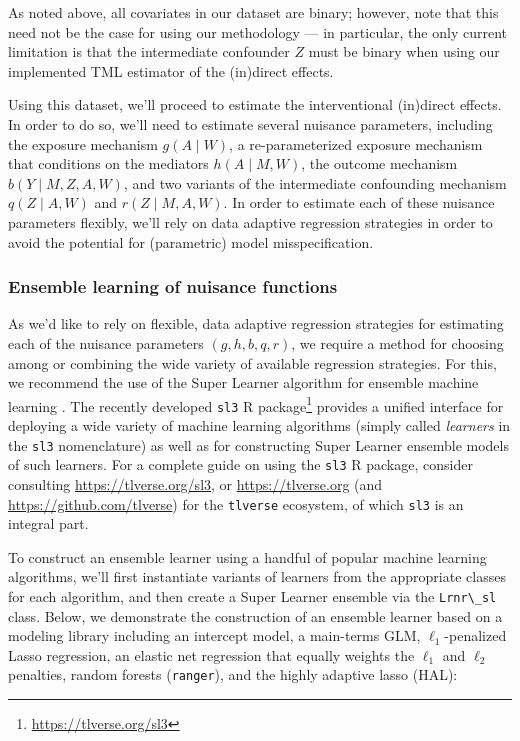 \documentclass[
  12pt,
]{book}
\newcommand{\passthrough}[1]{#1}
\renewcommand{\href}[2]{#2\footnote{\url{#1}}}
\theoremstyle{definition}
\theoremstyle{definition}
\theoremstyle{definition}
\newcommand{\1}{\mathbbm{1}}
\begin{document}
As noted above, all covariates in our dataset are binary; however, note that
this need not be the case for using our methodology --- in particular, the only
current limitation is that the intermediate confounder \(Z\) must be binary when
using our implemented TML estimator of the (in)direct effects.

Using this dataset, we'll proceed to estimate the interventional (in)direct
effects. In order to do so, we'll need to estimate several nuisance parameters,
including the exposure mechanism \(g(A \mid W)\), a re-parameterized exposure
mechanism that conditions on the mediators \(h(A \mid M, W)\), the outcome
mechanism \(b(Y \mid M, Z, A, W)\), and two variants of the intermediate
confounding mechanism \(q(Z \mid A, W)\) and \(r(Z \mid M, A, W)\). In order to
estimate each of these nuisance parameters flexibly, we'll rely on data adaptive
regression strategies in order to avoid the potential for (parametric) model
misspecification.

\hypertarget{ensemble-learning-of-nuisance-functions}{%
\subsubsection{Ensemble learning of nuisance functions}\label{ensemble-learning-of-nuisance-functions}}

As we'd like to rely on flexible, data adaptive regression strategies for
estimating each of the nuisance parameters \((g, h, b, q, r)\), we require a
method for choosing among or combining the wide variety of available regression
strategies. For this, we recommend the use of the Super Learner algorithm for
ensemble machine learning \citep{vdl2007super}. The recently developed \href{https://tlverse.org/sl3}{\passthrough{\lstinline!sl3!} R
package} \citep{coyle2020sl3} provides a unified interface
for deploying a wide variety of machine learning algorithms (simply called
\emph{learners} in the \passthrough{\lstinline!sl3!} nomenclature) as well as for constructing Super Learner
ensemble models of such learners. For a complete guide on using the \passthrough{\lstinline!sl3!} R
package, consider consulting \url{https://tlverse.org/sl3}, or \url{https://tlverse.org}
(and \url{https://github.com/tlverse}) for the \passthrough{\lstinline!tlverse!} ecosystem, of which \passthrough{\lstinline!sl3!} is
an integral part.

To construct an ensemble learner using a handful of popular machine learning
algorithms, we'll first instantiate variants of learners from the appropriate
classes for each algorithm, and then create a Super Learner ensemble via the
\passthrough{\lstinline!Lrnr\_sl!} class. Below, we demonstrate the construction of an ensemble learner
based on a modeling library including an intercept model, a main-terms GLM,
\(\ell_1\)-penalized Lasso regression, an elastic net regression that equally
weights the \(\ell_1\) and \(\ell_2\) penalties, random forests (\passthrough{\lstinline!ranger!}), and the
highly adaptive lasso (HAL):
\end{document}
